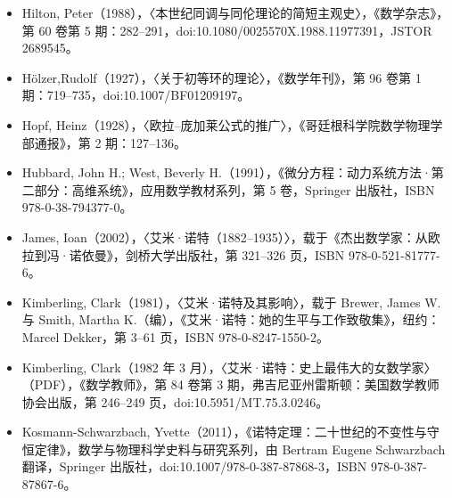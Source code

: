 \begin{itemize}
\item Hilton, Peter（1988），〈本世纪同调与同伦理论的简短主观史〉，《数学杂志》，第 60 卷第 5 期：282–291，doi:10.1080/0025570X.1988.11977391，JSTOR 2689545。
\item Hölzer,Rudolf（1927），〈关于初等环的理论〉，《数学年刊》，第 96 卷第 1 期：719–735，doi:10.1007/BF01209197。
\item Hopf, Heinz（1928），〈欧拉–庞加莱公式的推广〉，《哥廷根科学院数学物理学部通报》，第 2 期：127–136。
\item Hubbard, John H.; West, Beverly H.（1991），《微分方程：动力系统方法·第二部分：高维系统》，应用数学教材系列，第 5 卷，Springer 出版社，ISBN 978-0-38-794377-0。
\item James, Ioan（2002），〈艾米·诺特（1882–1935）〉，载于《杰出数学家：从欧拉到冯·诺依曼》，剑桥大学出版社，第 321–326 页，ISBN 978-0-521-81777-6。
\item Kimberling, Clark（1981），〈艾米·诺特及其影响〉，载于 Brewer, James W. 与 Smith, Martha K.（编），《艾米·诺特：她的生平与工作致敬集》，纽约：Marcel Dekker，第 3–61 页，ISBN 978-0-8247-1550-2。
\item Kimberling, Clark（1982 年 3 月），〈艾米·诺特：史上最伟大的女数学家〉（PDF），《数学教师》，第 84 卷第 3 期，弗吉尼亚州雷斯顿：美国数学教师协会出版，第 246–249 页，doi:10.5951/MT.75.3.0246。
\item Kosmann-Schwarzbach, Yvette（2011），《诺特定理：二十世纪的不变性与守恒定律》，数学与物理科学史料与研究系列，由 Bertram Eugene Schwarzbach 翻译，Springer 出版社，doi:10.1007/978-0-387-87868-3，ISBN 978-0-387-87867-6。

\end{itemize}